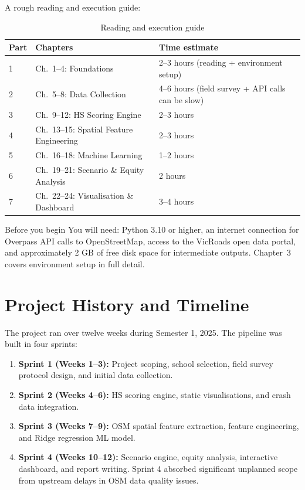 \documentclass[11pt,a4paper,openany]{book}
\begin{document}
A rough reading and execution guide:

\begin{table}[H]
\centering
\caption{Reading and execution guide}
\begin{tabular}{C{1.2cm}L{4.5cm}L{6cm}}
\toprule
\textbf{Part} & \textbf{Chapters} & \textbf{Time estimate} \\
 & Ch.~1--4: Foundations & 2--3 hours (reading + environment setup) \\
2 & Ch.~5--8: Data Collection & 4--6 hours (field survey + API calls can be slow) \\
3 & Ch.~9--12: HS Scoring Engine & 2--3 hours \\
4 & Ch.~13--15: Spatial Feature Engineering & 2--3 hours \\
5 & Ch.~16--18: Machine Learning & 1--2 hours \\
6 & Ch.~19--21: Scenario \& Equity Analysis & 2 hours \\
7 & Ch.~22--24: Visualisation \& Dashboard & 3--4 hours \\
\bottomrule
\end{tabular}
\end{table}

\begin{keybox}{Before you begin}
You will need: Python 3.10 or higher, an internet connection for Overpass API calls to OpenStreetMap, access to the VicRoads open data portal, and approximately 2 GB of free disk space for intermediate outputs. Chapter~3 covers environment setup in full detail.
\end{keybox}

\section{Project History and Timeline}

The project ran over twelve weeks during Semester 1, 2025. The pipeline was built in four sprints:

\begin{enumerate}
  \item \textbf{Sprint 1 (Weeks 1--3):} Project scoping, school selection, field survey protocol design, and initial data collection.
  \item \textbf{Sprint 2 (Weeks 4--6):} HS scoring engine, static visualisations, and crash data integration.
  \item \textbf{Sprint 3 (Weeks 7--9):} OSM spatial feature extraction, feature engineering, and Ridge regression ML model.
  \item \textbf{Sprint 4 (Weeks 10--12):} Scenario engine, equity analysis, interactive dashboard, and report writing. Sprint 4 absorbed significant unplanned scope from upstream delays in OSM data quality issues.
\end{enumerate}
\end{document}
